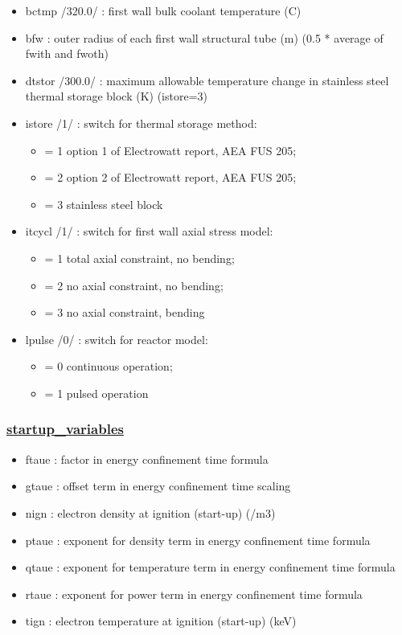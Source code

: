 \documentclass[]{article}
\providecommand{\tightlist}{%
  \setlength{\itemsep}{0pt}\setlength{\parskip}{0pt}}
\begin{document}
\begin{itemize}
\tightlist
\item
  bctmp /320.0/ : first wall bulk coolant temperature (C)
\item
  bfw : outer radius of each first wall structural tube (m) (0.5 *
  average of fwith and fwoth)
\item
  dtstor /300.0/ : maximum allowable temperature change in stainless
  steel thermal storage block (K) (istore=3)
\item
  istore /1/ : switch for thermal storage method:

  \begin{itemize}
  \tightlist
  \item
    = 1 option 1 of Electrowatt report, AEA FUS 205;
  \item
    = 2 option 2 of Electrowatt report, AEA FUS 205;
  \item
    = 3 stainless steel block
  \end{itemize}
\item
  itcycl /1/ : switch for first wall axial stress model:

  \begin{itemize}
  \tightlist
  \item
    = 1 total axial constraint, no bending;
  \item
    = 2 no axial constraint, no bending;
  \item
    = 3 no axial constraint, bending
  \end{itemize}
\item
  lpulse /0/ : switch for reactor model:

  \begin{itemize}
  \tightlist
  \item
    = 0 continuous operation;
  \item
    = 1 pulsed operation
  \end{itemize}
\end{itemize}

\subsubsection{\texorpdfstring{\href{startup_variables.html}{startup\_variables}}{startup\_variables}}\label{startup_variables}

\begin{itemize}
\tightlist
\item
  ftaue : factor in energy confinement time formula
\item
  gtaue : offset term in energy confinement time scaling
\item
  nign : electron density at ignition (start-up) (/m3)
\item
  ptaue : exponent for density term in energy confinement time formula
\item
  qtaue : exponent for temperature term in energy confinement time
  formula
\item
  rtaue : exponent for power term in energy confinement time formula
\item
  tign : electron temperature at ignition (start-up) (keV)
\end{itemize}
\end{document}
